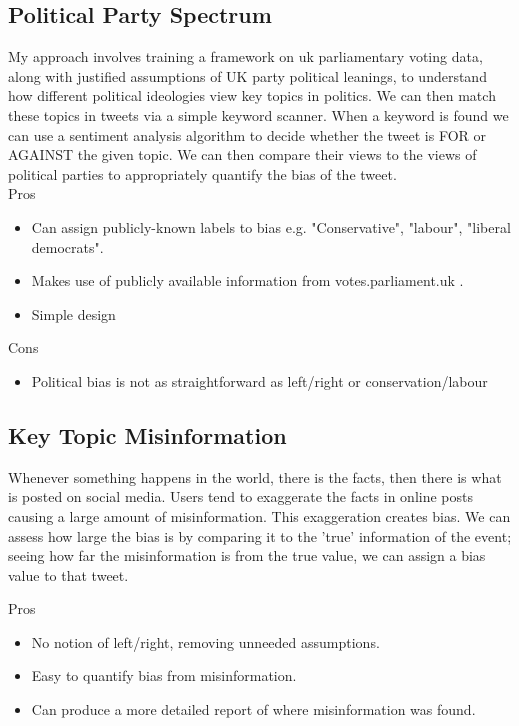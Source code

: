 \documentclass[a4paper,fleqn,10pt]{article}
\begin{document}
\subsection{Political Party Spectrum}
\label{subsec:polspectrum}
My approach involves training a framework on uk parliamentary voting data, along with justified assumptions
of UK party political leanings, to understand how different political ideologies view key topics in politics.
We can then match these topics in tweets via a simple keyword scanner. When a keyword is found we can use a sentiment analysis
algorithm to decide whether the tweet is FOR or AGAINST the given topic. We can then compare their views to the views of
political parties to appropriately quantify the bias of the tweet.
\\
Pros
\begin{itemize}
    \item Can assign publicly-known labels to bias e.g. "Conservative", "labour", "liberal democrats".
    \item Makes use of publicly available information from votes.parliament.uk .
    \item Simple design
\end{itemize}

Cons
\begin{itemize}
    \item Political bias is not as straightforward as left/right or conservation/labour
\end{itemize}

\subsection{Key Topic Misinformation}
\label{subsec:misinformation}
Whenever something happens in the world, there is the facts, then there is what is posted on social media.
Users tend to exaggerate the facts in online posts causing a large amount of misinformation. This exaggeration creates bias.
We can assess how large the bias is by comparing it to the 'true' information of the event; seeing how far the misinformation
is from the true value, we can assign a bias value to that tweet.

Pros
\begin{itemize}
    \item No notion of left/right, removing unneeded assumptions.
    \item Easy to quantify bias from misinformation.
    \item Can produce a more detailed report of where misinformation was found.
\end{itemize}
\end{document}
